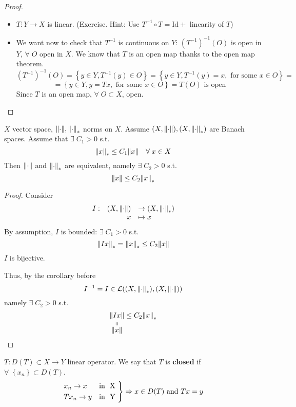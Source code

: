 \begin{proof}
    \begin{itemize}
        \item \(T : Y \to X\) is linear. (Exercise. Hint: Use \(T^{-1} \circ T = \text{Id} + \) linearity of \(T\))
        \item We want now to check that \(T^{-1}\) is continuous on \(Y\): \((T^{-1})^{-1}(O)\) is open in \(Y\), \(\forall \; O\) open in \(X\). We know that \(T\) is an open map thanks to the open map theorem.
        \[
            (T^{-1})^{-1}(O) = \left\{ y \in Y, T^{-1}(y) \in O \right\} = \left\{ y \in Y, T^{-1}(y) = x, \mbox{ for some } x \in O \right\} =
        \]
        \[
            = \left\{ y \in Y, y = Tx, \mbox{ for some } x \in O\right\} = T(O) \mbox{ is open}
        \]
    Since \(T\) is an open map, \(\forall \; O \subset X\), open.
    \end{itemize}
\end{proof}
\begin{corollary}
    \(X\) vector space, \(\normdot, \normdot_*\) norms on \(X\). Assume \((X, \normdot), (X, \normdot_*)\) are Banach spaces. 
    Assume that \(\exists \; C_1 > 0\) s.t. 
    \[
        \norm{x}_* \leq C_1\norm{x} \quad \forall \; x \in X
    \]
    Then \(\normdot\) and \(\normdot_*\) are equivalent, namely \(\exists \; C_2 > 0\) s.t. 
    \[
        \norm{x} \leq C_2 \norm{x}_*
    \]
\end{corollary}
\begin{proof}
    Consider
    \[
        \begin{array}{lrl}
            I :& (X, \normdot) & \to (X, \normdot_*) \\
            &x & \mapsto x
        \end{array}
    \]
    By assumption, \(I\) is bounded: \(\exists \; C_1 > 0\) s.t. 
    \[
        \norm{Ix}_* = \norm{x}_* \leq C_2 \norm{x}
    \]
    \(I\) is bijective.

    Thus, by the corollary before
    \[
        I^{-1} = I \in \mathcal{L}((X, \normdot_*), (X, \normdot))
    \]
    namely \(\exists \; C_2 > 0\) s.t. 
    \[
        \stackbelow{\norm{Ix}}{\norm{x}} \leq C_2 \norm{x}_*
    \]
\end{proof}
\begin{definition}
    \(T : D(T) \subset X \to Y\) linear operator. We say that \(T\) is \textbf{closed} if \(\forall \; \left\{ x_n \right\} \subset D(T)\). 
    \[
        \begin{rcases*}
            x_n \to x & \mbox{in } X \\
            Tx_n \to y & \mbox{in } Y
        \end{rcases*} \Rightarrow x \in D(T) \mbox{ and } Tx = y
    \]

\end{definition}
